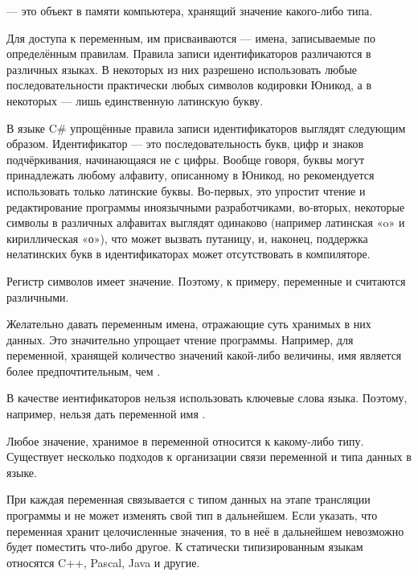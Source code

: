 \begin{defn}
   — это объект в памяти компьютера,
  хранящий значение какого-либо типа.
\end{defn}


Для доступа к переменным, им присваиваются
 — имена, записываемые по
определённым правилам. Правила записи идентификаторов различаются в
различных языках. В некоторых из них разрешено использовать любые
последовательности практически любых символов кодировки Юникод, а в
некоторых — лишь единственную латинскую букву.

В языке C\# упрощённые правила записи идентификаторов выглядят
следующим образом. Идентификатор — это последовательность букв, цифр и
знаков подчёркивания, начинающаяся не с цифры. Вообще говоря, буквы
могут принадлежать любому алфавиту, описанному в Юникод, но
рекомендуется использовать только латинские буквы. Во-первых, это
упростит чтение и редактирование программы иноязычными разработчиками,
во-вторых, некоторые символы в различных алфавитах выглядят одинаково
(например латинская «o» и кириллическая «о»), что может вызвать
путаницу, и, наконец, поддержка нелатинских букв в идентификаторах
может отсутствовать в компиляторе.

Регистр символов имеет значение. Поэтому, к примеру, переменные
 и  считаются различными.

Желательно давать переменным имена, отражающие суть хранимых в них
данных. Это значительно упрощает чтение программы. Например, для
переменной, хранящей количество значений какой-либо величины, имя
 является более предпочтительным, чем
.

В качестве иентификаторов нельзя использовать ключевые слова
языка. Поэтому, например, нельзя дать переменной имя .


Любое значение, хранимое в переменной относится к какому-либо типу.
Существует несколько подходов к организации связи переменной и типа
данных в языке.

При  каждая
переменная связывается с типом данных на этапе трансляции программы и
не может изменять свой тип в дальнейшем. Если указать, что переменная
хранит целочисленные значения, то в неё в дальнейшем невозможно будет
поместить что-либо другое.  К статически типизированным языкам
относятся C++, Pascal, Java и другие.

